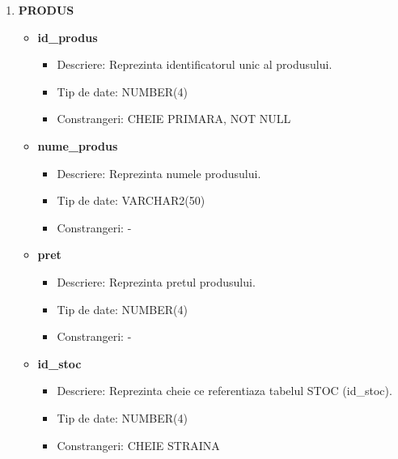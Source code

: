 \begin{enumerate}
\begin{itemize}
    \end{itemize}

    \vspace{0.5cm}

    \item \textbf{PRODUS}
    \begin{itemize}
    
        \item \textbf{id\_produs}
                \begin{itemize}
                    \item Descriere: Reprezinta identificatorul unic al produsului.
                    \item Tip de date: NUMBER(4)
                    \item Constrangeri: CHEIE PRIMARA, NOT NULL
                \end{itemize}

        \item \textbf{nume\_produs}
                \begin{itemize}
                    \item Descriere: Reprezinta numele produsului.
                    \item Tip de date: VARCHAR2(50)
                    \item Constrangeri: -
                \end{itemize}

        \item \textbf{pret}
                \begin{itemize}
                    \item Descriere: Reprezinta pretul produsului.
                    \item Tip de date: NUMBER(4)
                    \item Constrangeri: -
                \end{itemize}
                
       \item \textbf{id\_stoc}
                \begin{itemize}
                    \item Descriere: Reprezinta cheie ce referentiaza tabelul STOC (id\_stoc).
                    \item Tip de date: NUMBER(4)
                    \item Constrangeri: CHEIE STRAINA
                \end{itemize}


\end{itemize}
\end{enumerate}
